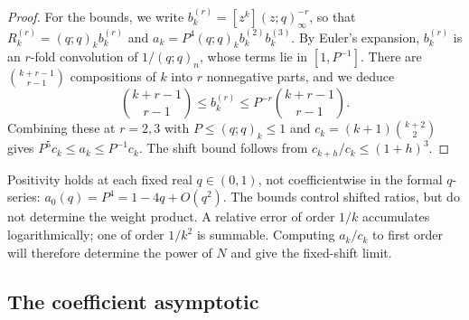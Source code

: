 \documentclass[11pt]{article}
\begin{document}
\begin{proof}
For the bounds, we write $b_k^{(r)}=[z^k](z;q)_\infty^{-r}$, so that
$R_k^{(r)}=(q;q)_kb_k^{(r)}$ and
$a_k=P^4(q;q)_kb_k^{(2)}b_k^{(3)}$. By Euler's expansion,
$b_k^{(r)}$ is an $r$-fold convolution of $1/(q;q)_n$, whose terms lie
in $[1,P^{-1}]$. There are $\binom{k+r-1}{r-1}$ compositions of $k$
into $r$ nonnegative parts, and we deduce
\[
 \binom{k+r-1}{r-1}\le b_k^{(r)}\le P^{-r}\binom{k+r-1}{r-1}.
\]
Combining these at $r=2,3$ with $P\le(q;q)_k\le1$ and
$c_k=(k+1)\binom{k+2}2$ gives $P^5c_k\le a_k\le P^{-1}c_k$. The shift bound
follows from $c_{k+h}/c_k\le(1+h)^3$.

\end{proof}

Positivity holds at each fixed real $q\in(0,1)$, not coefficientwise
in the formal $q$-series: $a_0(q)=P^4=1-4q+O(q^2)$.
The bounds control shifted ratios, but do not determine the weight
product. A relative error of order $1/k$ accumulates logarithmically;
one of order $1/k^2$ is summable. Computing $a_k/c_k$ to first order
will therefore determine the power of $N$ and give the fixed-shift
limit.

\subsection{The coefficient asymptotic}\label{sec:coefficient-asymptotic}
\end{document}
